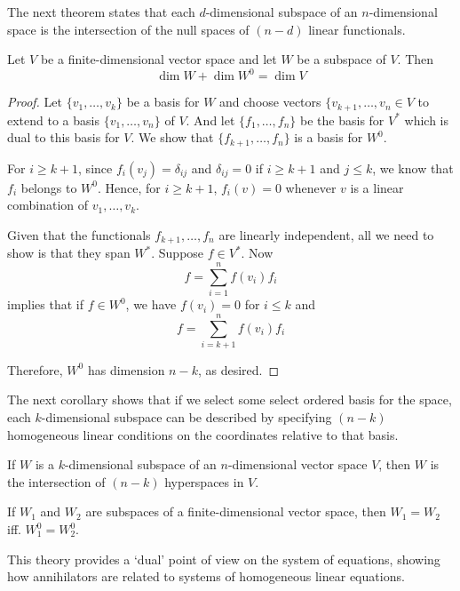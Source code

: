 The next theorem states that each $d$-dimensional subspace of an $n$-dimensional space is the intersection of the null spaces of $(n-d)$ linear functionals.

\begin{theorem}
	Let $V$ be a finite-dimensional vector space and let $W$ be a subspace of $V$. Then
	\[
		\dim W + \dim W^0 = \dim V
	\]
\end{theorem}

\begin{proof}
	Let $\{ v_1, \ldots, v_k \}$ be a basis for $W$ and choose vectors $\{ v_{k+1}, \ldots, v_n \in V$ to extend to a basis $\{ v_1, \ldots, v_n \}$ of $V$. And let $ \{ f_1, \ldots, f_n \}$ be the basis for $V^\ast$ which is dual to this basis for $V$. We show that $\{ f_{k+1}, \ldots, f_n \}$ is a basis for $W^0$.

	For $i \geq k+1$, since $f_i(v_j) = \delta_{ij}$ and $\delta_{ij} = 0$ if $i \geq k+1$ and $j \leq k$, we know that $f_i$ belongs to $W^0$. Hence, for $i \geq k+1$,  $f_i(v) = 0$ whenever $v$ is a linear combination of $v_1, \ldots, v_k$.

	Given that the functionals $f_{k+1}, \ldots, f_n$ are linearly independent, all we need to show is that they span $W^\ast$. Suppose $f \in V^\ast$. Now 
	\[
		f = \sum_{i=1}^n f(v_i)f_i
	\]
	implies that if $f \in W^0$, we have $f(v_i) = 0$ for $i \leq k$ and
	\[
		f = \sum_{i = k+1}^n f(v_i) f_i
	\]

	Therefore, $W^0$ has dimension $n-k$, as desired.
\end{proof}

The next corollary shows that if we select some select ordered basis for the space, each $k$-dimensional subspace can be described by specifying $(n-k)$ homogeneous linear conditions on the coordinates relative to that basis.

\begin{corollary}
	If $W$ is a $k$-dimensional subspace of an $n$-dimensional vector space $V$, then $W$ is the intersection of $(n-k)$ hyperspaces in $V$.
\end{corollary}

\begin{corollary}
	If $W_1$ and $W_2$ are subspaces of a finite-dimensional vector space, then $W_1 = W_2$ iff. $W_1^0 = W_2^0$.
\end{corollary}

This theory provides a `dual' point of view on the system of equations, showing how annihilators are related to systems of homogeneous linear equations.

